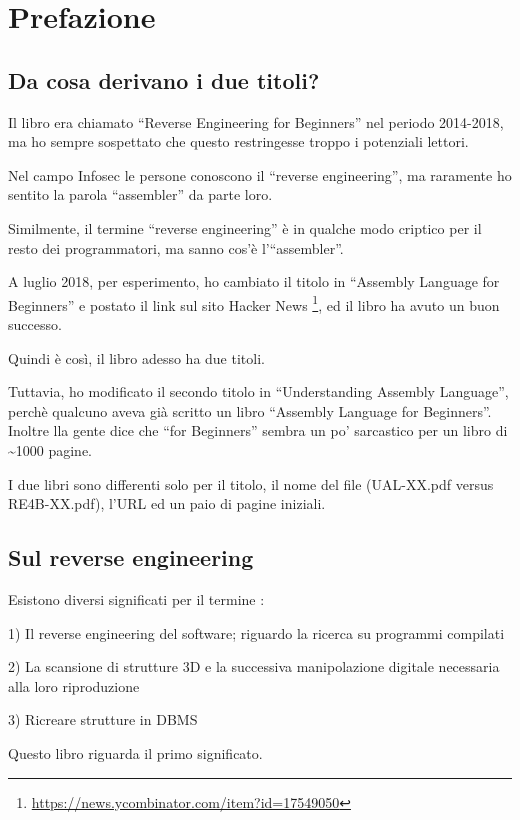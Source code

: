 \section*{Prefazione}

\subsection*{Da cosa derivano i due titoli?}
\label{TwoTitles}

Il libro era chiamato ``Reverse Engineering for Beginners'' nel periodo 2014-2018, ma ho sempre sospettato che questo restringesse troppo i potenziali lettori.

Nel campo Infosec le persone conoscono il ``reverse engineering'', ma raramente ho sentito la parola ``assembler'' da parte loro.

Similmente, il termine ``reverse engineering'' è in qualche modo criptico per il resto dei programmatori, ma sanno cos'è l'``assembler''.

A luglio 2018, per esperimento, ho cambiato il titolo in ``Assembly Language for Beginners''
e postato il link sul sito Hacker News \footnote{\url{https://news.ycombinator.com/item?id=17549050}}, ed il libro ha avuto un buon successo.

Quindi è così, il libro adesso ha due titoli.

Tuttavia, ho modificato il secondo titolo in ``Understanding Assembly Language'', perchè qualcuno aveva già scritto un libro ``Assembly Language for Beginners''.
Inoltre lla gente dice che ``for Beginners'' sembra un po' sarcastico per un libro di \textasciitilde{}1000 pagine.

I due libri sono differenti solo per il titolo, il nome del file (UAL-XX.pdf versus RE4B-XX.pdf), l'URL ed un paio di pagine iniziali.

\subsection*{Sul reverse engineering}

Esistono diversi significati per il termine :

1) Il reverse engineering del software; riguardo la ricerca su programmi compilati

2) La scansione di strutture 3D e la successiva manipolazione digitale necessaria alla loro riproduzione

3) Ricreare strutture in \ac{DBMS}

Questo libro riguarda il primo significato.

